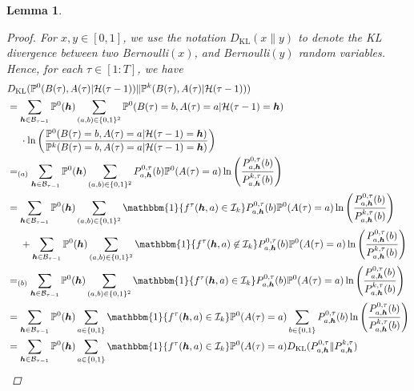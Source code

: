 \documentclass[12pt,draftcls, onecolumn]{IEEEtran}
\renewcommand{\vec}[1]{\ensuremath{\boldsymbol{#1}}}
\newtheorem{lemma}{Lemma}
\begin{document}
{\begin{lemma}
\begin{proof}
For $x,y \in [0,1]$, we use the notation $D_{\text{KL}}(x\lVert y)$ to denote the KL divergence between two Bernoulli$(x)$, and Bernoulli$(y)$ random variables. Hence, for each $\tau \in [1:T]$, we have
\begin{align}
     &D_{\text{KL}}(\mathbb{P}^0(B(\tau), A(\tau)|\mathcal{H}(\tau-1))\lVert \mathbb{P}^k(B(\tau), A(\tau)|\mathcal{H}(\tau-1))) \nonumber\\&  =  \sum_{\vec{h} \in \mathcal{B}_{\tau-1}}\mathbb{P}^0(\vec{h})\sum_{(a,b) \in \{0,1\}^2}\mathbb{P}^0(B(\tau) = b, A(\tau) = a| \mathcal{H}(\tau-1) = \vec{h})  \nonumber\\&\ \ \ \ \cdot\ln\left(\frac{\mathbb{P}^0(B(\tau) = b, A(\tau) = a| \mathcal{H}(\tau-1) = \vec{h})}{\mathbb{P}^k(B(\tau) = b, A(\tau) = a| \mathcal{H}(\tau-1) = \vec{h})}\right)\nonumber\\& =_{(a)}  
     \sum_{\vec{h} \in \mathcal{B}_{\tau-1}} \mathbb{P}^0(\vec{h})\sum_{(a,b) \in \{0,1\}^2} P^{0,\tau}_{a,\vec{h}}(b)\mathbb{P}^0(A(\tau) = a) \ln\left(\frac{P^{0,\tau}_{a,\vec{h}}(b)}{P^{k,\tau}_{a,\vec{h}}(b)}\right)\nonumber\\&=\sum_{\vec{h} \in \mathcal{B}_{\tau-1}} \mathbb{P}^0(\vec{h})\sum_{(a,b) \in \{0,1\}^2}\mathbbm{1}\{f^{\tau}(\vec{h},a) \in \mathcal{I}_k\}P^{0,\tau}_{a,\vec{h}}(b)\mathbb{P}^0(A(\tau) = a) \ln\left(\frac{P^{0,\tau}_{a,\vec{h}}(b)}{P^{k,\tau}_{a,\vec{h}}(b)}\right)\nonumber\\&\ \ \ \   + \sum_{\vec{h} \in \mathcal{B}_{\tau-1}} \mathbb{P}^0(\vec{h})\sum_{(a,b) \in \{0,1\}^2}\mathbbm{1}\{f^{\tau}(\vec{h},a) \not\in \mathcal{I}_k\}P^{0,\tau}_{a,\vec{h}}(b)\mathbb{P}^0(A(\tau) = a) \ln\left(\frac{P^{0,\tau}_{a,\vec{h}}(b)}{P^{k,\tau}_{a,\vec{h}}(b)}\right)\nonumber\\&=_{(b)}\sum_{\vec{h} \in \mathcal{B}_{\tau-1}} \mathbb{P}^0(\vec{h})\sum_{(a,b) \in \{0,1\}^2} \mathbbm{1}\{f^{\tau}(\vec{h},a) \in \mathcal{I}_k\}P^{0,\tau}_{a,\vec{h}}(b)\mathbb{P}^0(A(\tau) = a) \ln\left(\frac{P^{0,\tau}_{a,\vec{h}}(b)}{P^{k,\tau}_{a,\vec{h}}(b)}\right)\nonumber\\&=\sum_{\vec{h} \in \mathcal{B}_{\tau-1}} \mathbb{P}^0(\vec{h})\sum_{a \in \{0,1\}} \mathbbm{1}\{f^{\tau}(\vec{h},a) \in \mathcal{I}_k\}\mathbb{P}^0(A(\tau) = a)\sum_{b \in \{0,1\}}P^{0,\tau}_{a,\vec{h}}(b) \ln\left(\frac{P^{0,\tau}_{a,\vec{h}}(b)}{P^{k,\tau}_{a,\vec{h}}(b)}\right)\nonumber\\&=\sum_{\vec{h} \in \mathcal{B}_{\tau-1}} \mathbb{P}^0(\vec{h})\sum_{a \in \{0,1\}} \mathbbm{1}\{f^{\tau}(\vec{h},a) \in \mathcal{I}_k\}\mathbb{P}^0(A(\tau) = a)D_{\text{KL}}(P^{0,\tau}_{a,\vec{h}}\lVert P^{k,\tau}_{a,\vec{h}}) 

\end{align}
\end{proof}
\end{lemma}}
\end{document}
